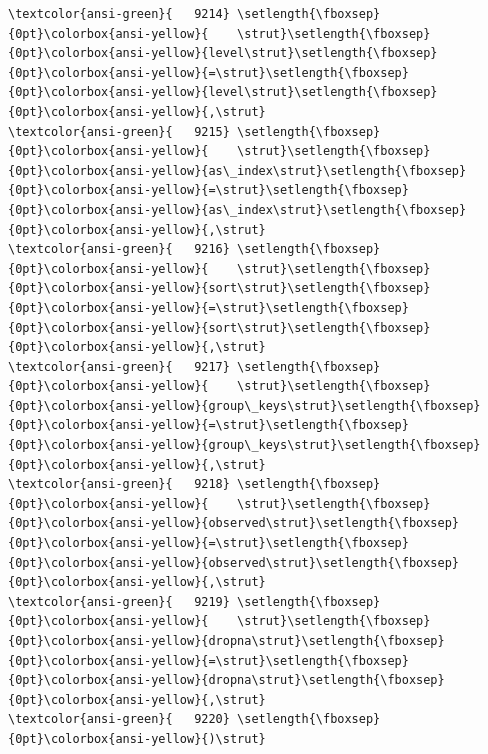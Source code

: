\documentclass[11pt]{article}
\begin{document}
\begin{Verbatim}[commandchars=\\\{\}, frame=single, framerule=2mm, rulecolor=\color{outerrorbackground}]
\textcolor{ansi-green}{   9214} \setlength{\fboxsep}{0pt}\colorbox{ansi-yellow}{    \strut}\setlength{\fboxsep}{0pt}\colorbox{ansi-yellow}{level\strut}\setlength{\fboxsep}{0pt}\colorbox{ansi-yellow}{=\strut}\setlength{\fboxsep}{0pt}\colorbox{ansi-yellow}{level\strut}\setlength{\fboxsep}{0pt}\colorbox{ansi-yellow}{,\strut}
\textcolor{ansi-green}{   9215} \setlength{\fboxsep}{0pt}\colorbox{ansi-yellow}{    \strut}\setlength{\fboxsep}{0pt}\colorbox{ansi-yellow}{as\_index\strut}\setlength{\fboxsep}{0pt}\colorbox{ansi-yellow}{=\strut}\setlength{\fboxsep}{0pt}\colorbox{ansi-yellow}{as\_index\strut}\setlength{\fboxsep}{0pt}\colorbox{ansi-yellow}{,\strut}
\textcolor{ansi-green}{   9216} \setlength{\fboxsep}{0pt}\colorbox{ansi-yellow}{    \strut}\setlength{\fboxsep}{0pt}\colorbox{ansi-yellow}{sort\strut}\setlength{\fboxsep}{0pt}\colorbox{ansi-yellow}{=\strut}\setlength{\fboxsep}{0pt}\colorbox{ansi-yellow}{sort\strut}\setlength{\fboxsep}{0pt}\colorbox{ansi-yellow}{,\strut}
\textcolor{ansi-green}{   9217} \setlength{\fboxsep}{0pt}\colorbox{ansi-yellow}{    \strut}\setlength{\fboxsep}{0pt}\colorbox{ansi-yellow}{group\_keys\strut}\setlength{\fboxsep}{0pt}\colorbox{ansi-yellow}{=\strut}\setlength{\fboxsep}{0pt}\colorbox{ansi-yellow}{group\_keys\strut}\setlength{\fboxsep}{0pt}\colorbox{ansi-yellow}{,\strut}
\textcolor{ansi-green}{   9218} \setlength{\fboxsep}{0pt}\colorbox{ansi-yellow}{    \strut}\setlength{\fboxsep}{0pt}\colorbox{ansi-yellow}{observed\strut}\setlength{\fboxsep}{0pt}\colorbox{ansi-yellow}{=\strut}\setlength{\fboxsep}{0pt}\colorbox{ansi-yellow}{observed\strut}\setlength{\fboxsep}{0pt}\colorbox{ansi-yellow}{,\strut}
\textcolor{ansi-green}{   9219} \setlength{\fboxsep}{0pt}\colorbox{ansi-yellow}{    \strut}\setlength{\fboxsep}{0pt}\colorbox{ansi-yellow}{dropna\strut}\setlength{\fboxsep}{0pt}\colorbox{ansi-yellow}{=\strut}\setlength{\fboxsep}{0pt}\colorbox{ansi-yellow}{dropna\strut}\setlength{\fboxsep}{0pt}\colorbox{ansi-yellow}{,\strut}
\textcolor{ansi-green}{   9220} \setlength{\fboxsep}{0pt}\colorbox{ansi-yellow}{)\strut}


\end{Verbatim}
\end{document}
